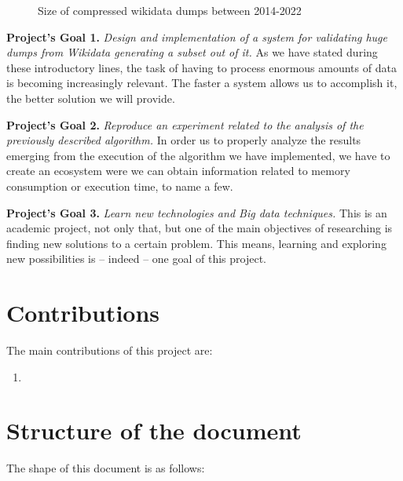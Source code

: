 \begin{figure}[h]
    \centering
    
    \caption[Plot showing the size of compressed dumps between 2014-22]{Size of compressed wikidata dumps between 2014-2022~\cite{https://doi.org/10.48550/arxiv.2110.11709}}
    \label{fig:dumps}
\end{figure}

\textbf{Project's Goal 1.} \textit{Design and implementation of a system for validating huge dumps from Wikidata generating a subset out of it.} As we have stated during these introductory lines, the task of having to process enormous amounts of data is becoming increasingly relevant. The faster a system allows us to accomplish it, the better solution we will provide.

\textbf{Project's Goal 2.} \textit{Reproduce an experiment related to the analysis of the previously described algorithm.} In order us to properly analyze the results emerging from the execution of the algorithm we have implemented, we have to create an ecosystem were we can obtain information related to memory consumption or execution time, to name a few.

\textbf{Project's Goal 3.} \textit{Learn new technologies and Big data techniques.} This is an academic project, not only that, but one of the main objectives of researching is finding new solutions to a certain problem. This means, learning and exploring new possibilities is -- indeed -- one goal of this project.

\section{Contributions}

The main contributions of this project are:

\begin{enumerate}
    \item
\end{enumerate}

\section{Structure of the document}

The shape of this document is as follows:

